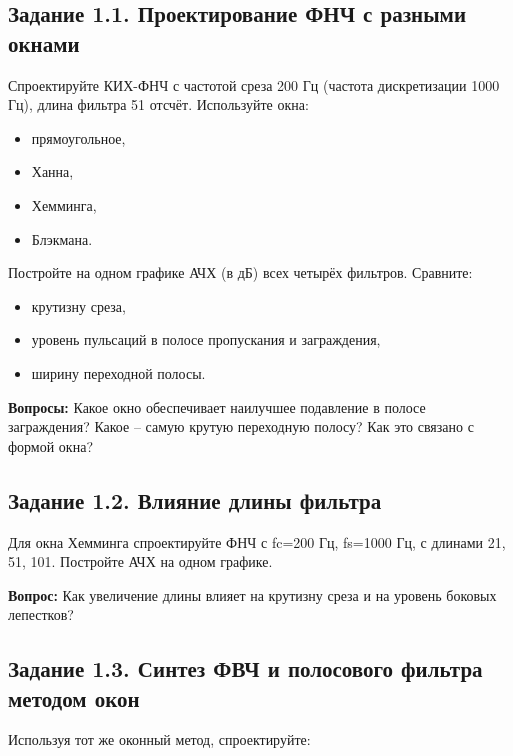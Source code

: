 \documentclass[12pt,a4paper,openany]{book}
\providecommand{\tightlist}{\setlength{\itemsep}{0pt}\setlength{\parskip}{0pt}}
\begin{document}
\subsection*{Задание 1.1. Проектирование ФНЧ с разными окнами}

Спроектируйте КИХ-ФНЧ с частотой среза 200 Гц (частота дискретизации 1000 Гц), длина фильтра 51 отсчёт. Используйте окна:

\begin{itemize}
\tightlist
\item
  прямоугольное,
\item
  Ханна,
\item
  Хемминга,
\item
  Блэкмана.
\end{itemize}

Постройте на одном графике АЧХ (в дБ) всех четырёх фильтров. Сравните:

\begin{itemize}
\tightlist
\item
  крутизну среза,
\item
  уровень пульсаций в полосе пропускания и заграждения,
\item
  ширину переходной полосы.
\end{itemize}

\textbf{Вопросы:} Какое окно обеспечивает наилучшее подавление в полосе заграждения? Какое -- самую крутую переходную полосу? Как это связано с формой окна?

\subsection*{Задание 1.2. Влияние длины фильтра}

Для окна Хемминга спроектируйте ФНЧ с fc=200 Гц, fs=1000 Гц, с длинами 21, 51, 101. Постройте АЧХ на одном графике.

\textbf{Вопрос:} Как увеличение длины влияет на крутизну среза и на уровень боковых лепестков?

\subsection*{Задание 1.3. Синтез ФВЧ и полосового фильтра методом окон}

Используя тот же оконный метод, спроектируйте:
\end{document}
